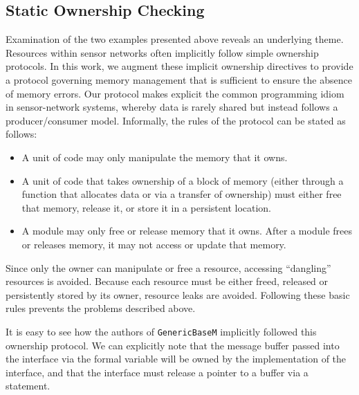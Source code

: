 
\subsection{Static Ownership Checking}

Examination of the two examples presented above reveals an underlying
theme.  Resources within sensor networks often implicitly follow
simple ownership protocols.  In this work, we augment these implicit
ownership directives to provide a protocol governing memory management
that is sufficient to ensure the absence of memory errors.  Our
protocol makes explicit the common programming idiom in sensor-network
systems, whereby data is rarely shared but instead follows a
producer/consumer model.  
%
Informally, the rules of the protocol can be stated as follows:
%
\begin{itemize}
%
\item A unit of code may only manipulate the memory that it owns.
%
\item A unit of code that takes ownership of a block of memory (either
through a function that allocates data or via a transfer of ownership)
must either free that memory, release it, or store it in a persistent
location.
%
\item A module may only free or release memory that it owns.  After a
module frees or releases memory, it may not access or update that
memory.
%
\end{itemize}
%
Since only the owner can manipulate or free a resource, accessing
``dangling'' resources is avoided.  Because each resource must be
either freed, released or persistently stored by its owner, resource
leaks are avoided.  
%
Following these basic rules prevents the problems described above.



\smallskip{}

It is easy to see how the authors of {\tt GenericBaseM} implicitly
followed this ownership protocol.  We can explicitly note that the
message buffer passed into the  interface via the formal
variable  will be owned
by the implementation of the interface, and that the 
interface must release a pointer to a buffer via a 
statement.

